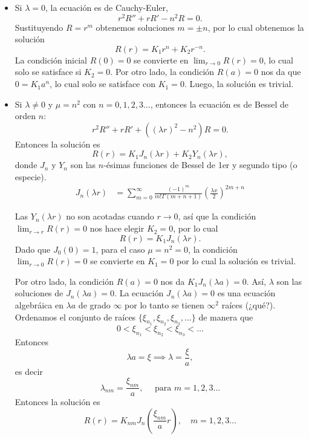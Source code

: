 \documentclass[11pt,letterpaper,draft]{report}
\newcommand\<{\langle}
\renewcommand\>{\rangle}
\begin{document}
\begin{itemize}
  \item Si $\lambda=0$, la ecuación es de Cauchy-Euler,
    \[
      r^{2}R''+rR'-n^{2}R = 0
    .\]
    Sustituyendo $R=r^m$ obtenemos soluciones $m=\pm n$, por lo
    cual obtenemos la solución
    \[
      R(r) = K_1r^n+K_2r^{-n}
    .\]
    La condición inicial $R(0)=0$ se convierte en $\lim_{r\to
    0}R(r)=0$, lo cual solo se satisface si $K_2=0$.
    Por otro lado, la condición $R(a)=0$ nos da que $0=K_1a^n$,
    lo cual solo se satisface con $K_1=0$.
    Luego, la solución es trivial.

  \item Si $\lambda\neq 0$ y $\mu=n^{2}$ con
    $n=0,1,2,3\dots$, entonces la ecuación es de
    Bessel de orden $n$:
    \[
      r^{2}R'' +rR' +((\lambda r)^{2}-n^{2})R = 0
    .\]
    Entonces la solución es
    \[
      R(r)
      =
      K_1J_n(\lambda r)
      +
      K_2Y_n(\lambda r)
    ,\]
    donde $J_n$ y $Y_n$ son las $n$-ésimas funciones de
    Bessel de 1er y segundo tipo (o especie).
    \begin{align*}
      J_n(\lambda r)
      &= \sum_{m=0}^{\infty}\frac{(-1)^m}{m!\Gamma(m+n+1)}
      \left(
        \frac{\lambda x}{2}
      \right)^{2m+n}
    \end{align*}

    Las $Y_n(\lambda r)$ no son acotadas cuando $r\to 0$,
    así que la condición $\lim_{r\to r}R(r)=0$ nos hace
    elegir $K_2=0$, por lo cual
    \[
      R(r)=K_1J_n(\lambda r)
    .\]
    Dado que $J_0(0) = 1$, para el caso $\mu = n^2 = 0$, la condición
    $\lim_{r\to 0} R(r) = 0$ se convierte en $K_1 = 0$ por lo cual la
    solución es trivial.
    
    Por otro lado, la condición $R(a)=0$ nos da
    $K_1J_n(\lambda a)=0$.
    Así, $\lambda$ son las soluciones de $J_n(\lambda a)=0$.
    La ecuación $J_n(\lambda a) = 0$ es una ecuación algebráica en
    $\lambda a$ de grado $\infty$ por lo tanto se tienen $\infty^2$
    raíces (¿qué?). Ordenamos el conjunto de raíces
    $\{ \xi_{n_1}, \xi_{n_2}, \xi_{n_3}, \dots\}$ de manera que
    \[
      0 < \xi_{n_1} < \xi_{n_2} < \xi_{n_3} < \dots
    \] Entonces
    \[
    \lambda a = \xi \implies \lambda = \frac{\xi}{a},
    \] es decir
    \[
      \lambda_{nm} = \frac{\xi_{nm}}{a}, \quad \text{ para } m = 1,2,3\dots
    \] Entonces la solución es
    \[
      R(r) = K_{nm} J_n\left(\frac{\xi_{nm}}{a}r\right), \quad m = 1,2,3 \dots
    \] 
\end{itemize}
\end{document}
